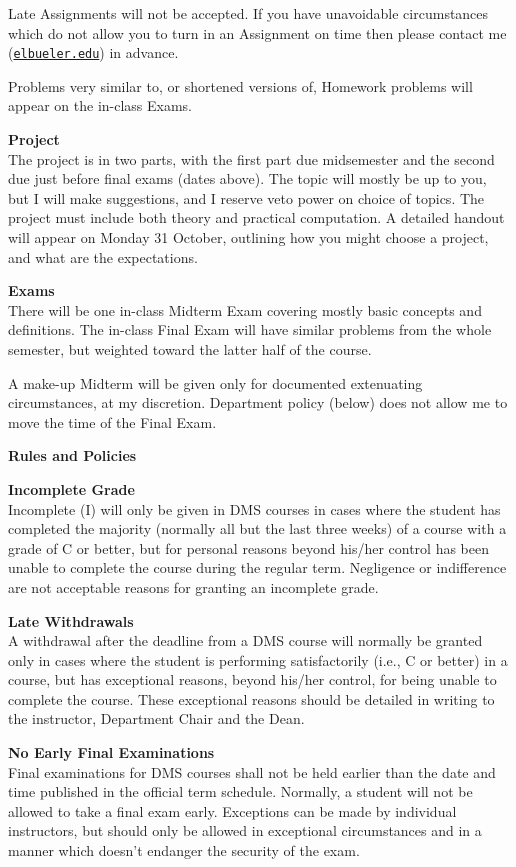 \documentclass[12pt]{article}
\renewcommand{\emph}[1]{\textsf{\textbf{#1}}}
\newcommand{\localhead}[1]{\par\smallskip\textbf{#1} \smallskip\nobreak\\}%
\def\heading#1{\localhead{\large\emph{#1}}}
\def\subheading#1{\localhead{\emph{#1}}}
\begin{document}
Late Assignments will not be accepted.  If you have unavoidable circumstances which do not allow you to turn in an Assignment on time then please contact me (\href{mailto:elbueler@alaska.edu}{\texttt{elbueler\@@alaska.edu}}) in advance.

Problems very similar to, or shortened versions of, Homework problems will appear on the in-class Exams.

\heading{Project}
The project is in two parts, with the first part due midsemester and the second due just before final exams (dates above).  The topic will mostly be up to you, but I will make suggestions, and I reserve veto power on choice of topics.  The project must include both theory and practical computation.  A detailed handout will appear on Monday 31 October, outlining how you might choose a project, and what are the expectations.

\heading{Exams}
There will be one in-class Midterm Exam covering mostly basic concepts and definitions. The in-class Final Exam will have similar problems from the whole semester, but weighted toward the latter half of the course.

A make-up Midterm will be given only for documented extenuating circumstances, at my discretion.  Department policy (below) does not allow me to move the time of the Final Exam.


\heading{Rules and Policies}
\vskip -20pt

\subheading{Incomplete Grade} 
Incomplete (I) will only be given in
  DMS courses in cases where
  the student has completed the majority (normally all but the last
  three weeks) of a course with a grade of C or better, but for
  personal reasons beyond his/her control has been unable to complete
  the course during the regular term. Negligence or indifference are
  not acceptable reasons for granting an incomplete grade.

\clearpage\newpage
\strut\vspace{-10pt}
\subheading{Late Withdrawals} 
A withdrawal after the deadline from a DMS course will
  normally be granted only in cases where the student is performing
  satisfactorily (i.e., C or better) in a course, but has exceptional
  reasons, beyond his/her control, for being unable to complete the
  course.  These exceptional reasons should be detailed in writing to
  the instructor, Department Chair and the Dean.

\subheading{No Early Final Examinations}
Final examinations for DMS courses shall not be held earlier than the date and time published in the official term schedule.  Normally, a student will not be allowed to take a final exam early.  Exceptions can be made by individual instructors, but should only be allowed in exceptional circumstances and in a manner which doesn't endanger the security of the exam.
\end{document}

